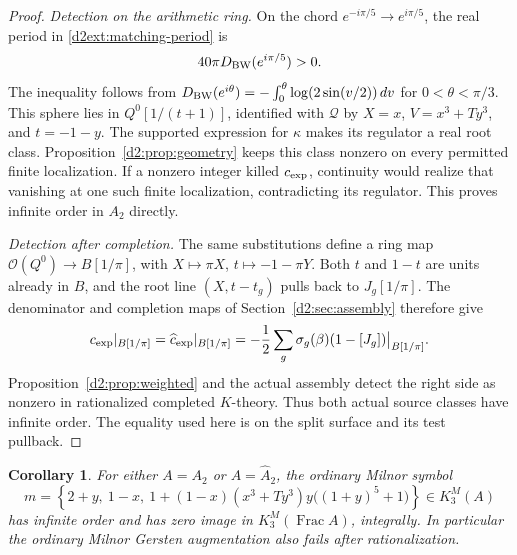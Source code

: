 \documentclass[11pt,a4paper]{amsart}
\numberwithin{equation}{section}
\newtheorem{corollary}[theorem]{Corollary}
\theoremstyle{definition}
\theoremstyle{remark}
\newcommand{\Frac}{\operatorname{Frac}}
\begin{document}
\begin{proof}
\emph{Detection on the arithmetic ring.}
On the chord $e^{-i\pi/5}\to e^{i\pi/5}$, the real period in \eqref{d2ext:matching-period} is
\[
 40\pi D_{\rm BW}(e^{i\pi/5})>0.
\]
The inequality follows from
$D_{\rm BW}(e^{i\theta})=-\int_0^\theta
\log(2\sin(v/2))\,dv$ for $0<\theta<\pi/3$.
This sphere lies in $Q^0[1/(t+1)]$, identified with $\mathcal Q$
by $X=x$, $V=x^3+Ty^3$, and $t=-1-y$.
The supported expression for $\kappa$ makes its regulator a real
root class. Proposition~\ref{d2:prop:geometry} keeps this class
nonzero on every permitted finite localization. If a nonzero
integer killed $c_{\rm exp}$, continuity would realize that
vanishing at one such finite localization, contradicting its
regulator. This proves infinite order in $A_2$ directly.

\emph{Detection after completion.}
The same substitutions define a ring map
$\mathcal O(Q^0)\to B[1/\pi]$,
with $X\mapsto\pi X$, $t\mapsto-1-\pi Y$.
Both $t$ and $1-t$ are units already in $B$, and the root line
$(X,t-t_g)$ pulls back to $J_g[1/\pi]$.
The denominator and completion maps of
Section~\ref{d2:sec:assembly} therefore give
\[
 c_{\rm exp}|_{B[1/\pi]}
 =\widehat c_{\rm exp}|_{B[1/\pi]}
 =-\frac12\sum_g\sigma_g(\beta)(1-[J_g])\big|_{B[1/\pi]}.
\]
Proposition~\ref{d2:prop:weighted} and the actual assembly
detect the right side as nonzero in rationalized completed
$K$-theory. Thus both actual source classes have infinite order.
The equality used here is on the split surface and its test pullback.
\end{proof}

\begin{corollary}
\label{d2ext:twodimexplicitMilnor}
For either $A=A_2$ or $A=\widehat A_2$, the ordinary Milnor symbol
\[
 m=\left\{2+y,\ 1-x,\
 1+(1-x)(x^3+Ty^3)y\bigl((1+y)^5+1\bigr)\right\}
       \in K_3^M(A)
\]
has infinite order and has zero image in
$K_3^M(\Frac A)$, integrally. In particular the ordinary
Milnor Gersten augmentation also fails after rationalization.
\end{corollary}
\end{document}
